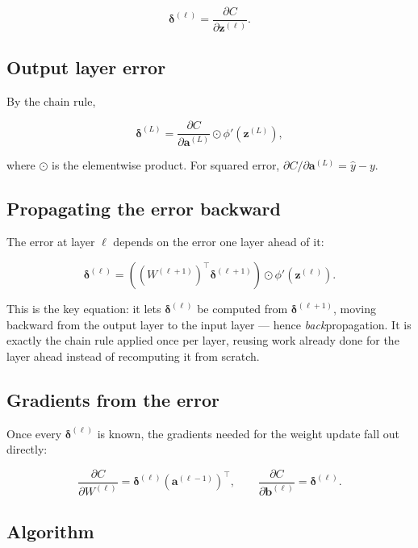 \documentclass[11pt]{article}
\begin{document}
\[
  \boldsymbol{\delta}^{(\ell)} = \frac{\partial C}{\partial \mathbf{z}^{(\ell)}}.
\]

\subsection{Output layer error}

By the chain rule,

\[
  \boldsymbol{\delta}^{(L)}
  = \frac{\partial C}{\partial \mathbf{a}^{(L)}} \odot \phi'\!\left(\mathbf{z}^{(L)}\right),
\]

where $\odot$ is the elementwise product. For squared error,
$\partial C / \partial \mathbf{a}^{(L)} = \hat{y} - y$.

\subsection{Propagating the error backward}

The error at layer $\ell$ depends on the error one layer ahead of it:

\[
  \boldsymbol{\delta}^{(\ell)}
  = \left(\left(W^{(\ell+1)}\right)^{\top} \boldsymbol{\delta}^{(\ell+1)}\right)
    \odot \phi'\!\left(\mathbf{z}^{(\ell)}\right).
\]

This is the key equation: it lets $\boldsymbol{\delta}^{(\ell)}$ be computed
from $\boldsymbol{\delta}^{(\ell+1)}$, moving backward from the output
layer to the input layer --- hence \emph{back}propagation. It is exactly
the chain rule applied once per layer, reusing work already done for the
layer ahead instead of recomputing it from scratch.

\subsection{Gradients from the error}

Once every $\boldsymbol{\delta}^{(\ell)}$ is known, the gradients needed
for the weight update fall out directly:

\[
  \frac{\partial C}{\partial W^{(\ell)}} = \boldsymbol{\delta}^{(\ell)} \left(\mathbf{a}^{(\ell-1)}\right)^{\top},
  \qquad
  \frac{\partial C}{\partial \mathbf{b}^{(\ell)}} = \boldsymbol{\delta}^{(\ell)}.
\]

\subsection{Algorithm}
\end{document}
